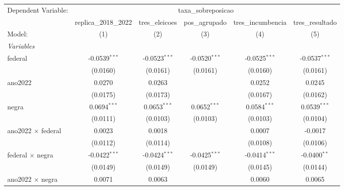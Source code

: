 
\begingroup
\centering
\begin{tabular}{lccccc}
   \tabularnewline \midrule \midrule
   Dependent Variable: & \multicolumn{5}{c}{taxa\_sobreposicao}\\
                                             & replica\_2018\_2022   & tres\_eleicoes  & pos\_agrupado   & tres\_incumbencia  & tres\_resultado \\    
   Model:                                    & (1)                   & (2)             & (3)             & (4)                & (5)\\  
   \midrule
   \emph{Variables}\\
   federal                                   & -0.0539$^{***}$       & -0.0523$^{***}$ & -0.0520$^{***}$ & -0.0525$^{***}$    & -0.0537$^{***}$\\   
                                             & (0.0160)              & (0.0161)        & (0.0161)        & (0.0160)           & (0.0161)\\   
   ano2022                                   & 0.0270                & 0.0263          &                 & 0.0252             & 0.0245\\   
                                             & (0.0175)              & (0.0173)        &                 & (0.0167)           & (0.0162)\\   
   negra                                     & 0.0694$^{***}$        & 0.0653$^{***}$  & 0.0652$^{***}$  & 0.0584$^{***}$     & 0.0539$^{***}$\\   
                                             & (0.0111)              & (0.0103)        & (0.0103)        & (0.0103)           & (0.0104)\\   
   ano2022 $\times$ federal                  & 0.0023                & 0.0018          &                 & 0.0007             & -0.0017\\   
                                             & (0.0112)              & (0.0114)        &                 & (0.0108)           & (0.0106)\\   
   federal $\times$ negra                    & -0.0422$^{***}$       & -0.0424$^{***}$ & -0.0425$^{***}$ & -0.0414$^{***}$    & -0.0400$^{**}$\\   
                                             & (0.0149)              & (0.0149)        & (0.0149)        & (0.0145)           & (0.0144)\\   
   ano2022 $\times$ negra                    & 0.0071                & 0.0063          &                 & 0.0060             & 0.0065\\   

\end{tabular}
